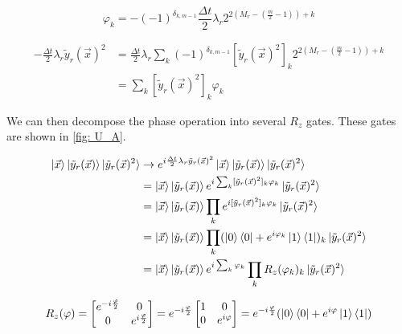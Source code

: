 \begin{equation}
    \varphi_k = -(-1)^{\delta_{k, m - 1}}\frac{\Delta t}{2}\lambda_r2^{2(M_r - (\frac{m}{2} - 1)) + k}
\end{equation}

\begin{equation}
    \begin{split}
        -\frac{\Delta t}{2}\lambda_r\tilde{y}_r(\vec{x})^2 &= \frac{\Delta t}{2}\lambda_r\sum_k (-1)^{\delta_{k, m - 1}}[\tilde{y}_r(\vec{x})^2]_k2^{2(M_r - (\frac{m}{2} - 1)) + k} \\
        &= \sum_k [\tilde{y}_r(\vec{x})^2]_k\varphi_k
    \end{split}
\end{equation}

We can then decompose the phase operation into several $R_z$ gates. These gates are shown in \ref{fig: U_A}.

\begin{equation}
    \begin{split}
        \ket{\vec{x}}\ket{\tilde{y}_r(\vec{x})}\ket{\tilde{y}_r(\vec{x})^2} &\rightarrow e^{i\frac{\Delta t}{2}\lambda_r\tilde{y}_r(\vec{x})^2}\ket{\vec{x}}\ket{\tilde{y}_r(\vec{x})}\ket{\tilde{y}_r(\vec{x})^2} \\
        &= \ket{\vec{x}}\ket{\tilde{y}_r(\vec{x})}e^{i\sum_k [\tilde{y}_r(\vec{x})^2]_k\varphi_k}\ket{\tilde{y}_r(\vec{x})^2} \\
        &= \ket{\vec{x}}\ket{\tilde{y}_r(\vec{x})}\prod_k e^{i[\tilde{y}_r(\vec{x})^2]_k\varphi_k}\ket{\tilde{y}_r(\vec{x})^2} \\
        &= \ket{\vec{x}}\ket{\tilde{y}_r(\vec{x})}\prod_k (\ket{0}\bra{0} + e^{i\varphi_k}\ket{1}\bra{1})_k \ket{\tilde{y}_r(\vec{x})^2} \\
        &= \ket{\vec{x}}\ket{\tilde{y}_r(\vec{x})}e^{i\sum_k \varphi_k}\prod_k R_z(\varphi_k)_k \ket{\tilde{y}_r(\vec{x})^2}
    \end{split}
\end{equation}

\begin{equation}
    R_z(\varphi) = \begin{bmatrix}
        e^{-i\frac{\varphi}{2}} & 0 \\ 0 & e^{i\frac{\varphi}{2}}
    \end{bmatrix} = e^{-i\frac{\varphi}{2}}\begin{bmatrix}
        1 & 0 \\ 0 & e^{i\varphi}
    \end{bmatrix} = e^{-i\frac{\varphi}{2}}(\ket{0}\bra{0} + e^{i\varphi}\ket{1}\bra{1})
\end{equation}

